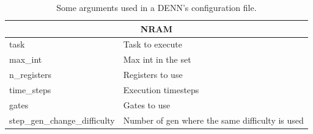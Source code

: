 \begin{table}[]
\begin{tabular}{|l|l|}
		\multicolumn{2}{|c|}{\textbf{NRAM}} \\ \hline
		task  	 		& Task to execute \\ \hline
		max\_int  		& Max int in the set \\ \hline
		n\_registers  	& Registers to use \\ \hline
		time\_steps  	& Execution timesteps \\ \hline
		gates  			& Gates to use \\ \hline
		step\_gen\_change\_difficulty & Number of gen where the same difficulty is used  \\ \hline

	\end{tabular}
	\caption{Some arguments used in a DENN's configuration file.}
	\label{tbl:denn-parameters}
\end{table}